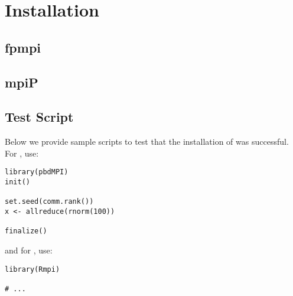 \section{Installation}
\label{sec:installation}



\subsection{fpmpi}


\subsection{mpiP}


\subsection{Test Script}

Below we provide sample scripts to test that the installation of  was successful.  For , use:
\begin{lstlisting}[title=Test script for pbdMPI]
library(pbdMPI)
init()

set.seed(comm.rank())
x <- allreduce(rnorm(100))

finalize()
\end{lstlisting}
and for , use:
\begin{lstlisting}[title=Test script for pbdMPI]
library(Rmpi)

# ...
\end{lstlisting}
